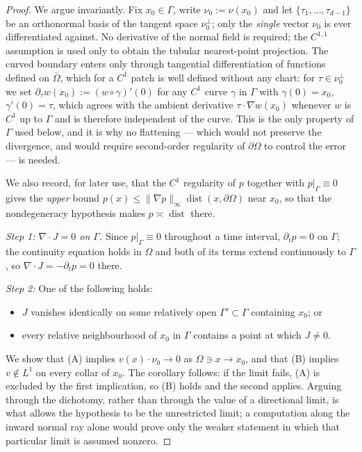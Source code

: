 \documentclass[10pt,a4paper]{amsart}
\newcommand{\dive}{\nabla\!\cdot}
\begin{document}
\begin{proof}
We argue invariantly. Fix $x_0\in\Gamma$, write $\nu_0:=\nu(x_0)$ and
let $\{\tau_1,\dots,\tau_{d-1}\}$ be an orthonormal basis of the
tangent space $\nu_0^\perp$; only the \emph{single} vector $\nu_0$
is ever differentiated against.
No derivative of the normal field is required; the $C^{1,1}$
 assumption is used only to obtain the tubular nearest-point projection.
The curved boundary enters only through tangential differentiation
of functions defined on $\bar\Omega$, which for a $C^1$ patch is
well defined without any chart: for $\tau\in\nu_0^\perp$ we set
$\partial_\tau w(x_0):=(w\circ\gamma)'(0)$ for any $C^1$ curve
$\gamma$ in $\Gamma$ with $\gamma(0)=x_0$, $\gamma'(0)=\tau$, which
agrees with the ambient derivative $\tau\cdot\nabla w(x_0)$ whenever
$w$ is $C^1$ up to $\Gamma$ and is therefore independent of the
curve. This is the only property of $\Gamma$ used below, and it is
why no flattening --- which would not preserve the divergence, and
would require second-order regularity of $\partial\Omega$ to
control the error --- is needed.

We also record, for later use, that the $C^1$ regularity of $p$
together with $p|_\Gamma\equiv0$ gives the \emph{upper} bound
$p(x)\le\|\nabla p\|_\infty\operatorname{dist}(x,\partial\Omega)$
near $x_0$, so that the nondegeneracy hypothesis makes
$p\asymp\operatorname{dist}$ there.

\emph{Step 1: $\dive J=0$ on $\Gamma$.} Since $p|_\Gamma\equiv0$
throughout a time interval, $\partial_tp=0$ on $\Gamma$; the
continuity equation holds in $\Omega$ and both of its terms extend
continuously to $\Gamma$, so $\dive J=-\partial_tp=0$ there.

\emph{Step 2:} One of the following holds:
\begin{itemize}
\item[(A)] $J$ vanishes identically on some relatively open
$\Gamma'\subset\Gamma$ containing $x_0$; or
\item[(B)] every relative neighbourhood of $x_0$ in $\Gamma$
contains a point at which $J\neq0$.
\end{itemize}
We show that \textup{(A)} implies $v(x)\cdot\nu_0\to0$ as
$\Omega\ni x\to x_0$, and that \textup{(B)} implies $v\notin L^1$ on
every collar of $x_0$. The corollary follows: if the limit fails,
\textup{(A)} is excluded by the first implication, so \textup{(B)}
holds and the second applies. Arguing through the dichotomy, rather
than through the value of a directional limit, is what allows the
hypothesis to be the unrestricted limit; a computation along the
inward normal ray alone would prove only the weaker statement in
which that particular limit is assumed nonzero.


\end{proof}
\end{document}
